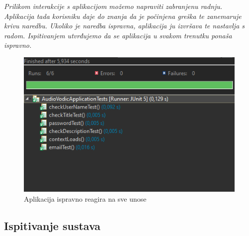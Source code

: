 		
			\newpage
			\textit{Prilikom interakcije s aplikacijom možemo napraviti zabranjenu radnju. Aplikacija tada korisniku daje do znanja da je počinjena greška te zanemaruje krivu naredbu. Ukoliko je naredba ispravna, aplikacija ju izvršava te nastavlja s radom. Ispitivanjem utvrđujemo da se aplikacija u svakom trenutku ponaša ispravno.  }
		
			\begin{figure}[H]
				\includegraphics[scale=1]{slike/prolazni_testovi.png}
				\centering
				\caption{Aplikacija ispravno reagira na sve unose}
				\label{fig:promjene}
			\end{figure}
		
			
			
			
			
			\newpage
			\subsection{Ispitivanje sustava}
			
